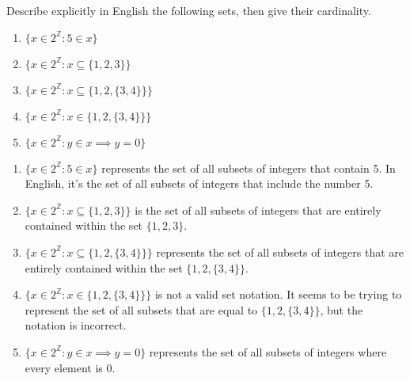 \documentclass{article}
\newcommand{\Z}{\mathbb{Z}}
\theoremstyle{definition}
\begin{document}
\begin{question}
Describe explicitly in English the following sets, then give their cardinality.

\begin{enumerate}
	\item $\{x \in 2^{\Z} : 5 \in x \}$
	\item $\{x \in 2^{\Z} : x \subseteq \{ 1, 2, 3\} \}$
	\item $\{x \in 2^{\Z} : x \subseteq \{ 1, 2, \{3, 4\} \} \}$
	\item $\{x \in 2^{\Z} : x \in \{ 1, 2, \{3, 4\} \} \}$
	\item $\{x \in 2^{\Z} : y \in x \implies y = 0 \}$
\end{enumerate}
\end{question}
\begin{solution}
\begin{enumerate}
    \item $\{x \in 2^{\Z} : 5 \in x \}$ represents the set of all subsets of integers that contain 5. In English, it's the set of all subsets of integers that include the number 5.
    
    \item $\{x \in 2^{\Z} : x \subseteq \{ 1, 2, 3\} \}$ is the set of all subsets of integers that are entirely contained within the set $\{1, 2, 3\}$.
    
    \item $\{x \in 2^{\Z} : x \subseteq \{ 1, 2, \{3, 4\} \} \}$ represents the set of all subsets of integers that are entirely contained within the set $\{1, 2, \{3, 4\}\}$.
    
    \item $\{x \in 2^{\Z} : x \in \{ 1, 2, \{3, 4\} \} \}$ is not a valid set notation. It seems to be trying to represent the set of all subsets that are equal to $\{1, 2, \{3, 4\}\}$, but the notation is incorrect.
    
    \item $\{x \in 2^{\Z} : y \in x \implies y = 0 \}$ represents the set of all subsets of integers where every element is 0.
\end{enumerate}
\end{solution}
\end{document}
